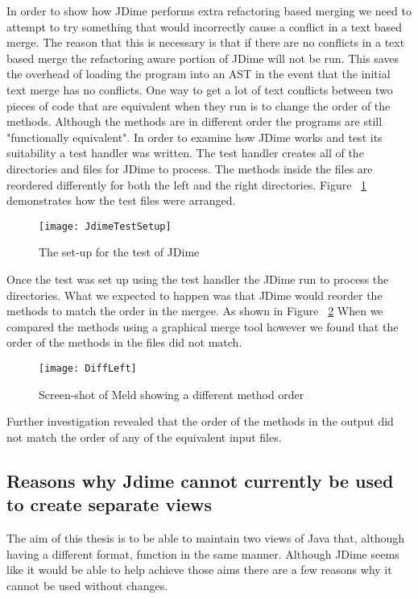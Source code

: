 In order to show how JDime performs extra refactoring based merging we need to attempt to try something that would incorrectly cause a conflict in a text based merge.  The reason that this is necessary is that if there are no conflicts in a text based merge the refactoring aware portion of JDime will not be run.  This saves the overhead of loading the program into an AST in the event that the initial text merge has no conflicts. 
One way to get a lot of text conflicts between two pieces of code that are equivalent when they run is to change the order of the methods.
Although the methods are in different order the programs are still "functionally equivalent".
In order to examine how JDime works and test its suitability a test handler was written.
The test handler creates all of the directories and files for JDime to process.
The methods inside the files are reordered differently for both the left and the right directories.
Figure ~\ref{fig:bgJDimeTest} demonstrates how the test files were arranged.


\begin{figure}[!t]
\begin{center}
\texttt{[image: JdimeTestSetup]}
\end{center}
 \label{fig:bgJDimeTest}
 \caption{The set-up for the test of JDime}
\end{figure}

Once the test was set up using the test handler the JDime run to process the directories.
What we expected to happen was that JDime would reorder the methods to match the order in the mergee. As shown in Figure ~\ref{fig:bgJDimeScreenShot} When we compared the methods using a graphical merge tool however we found that the order of the methods in the files did not match.

\begin{figure}[h]
\begin{center}
\texttt{[image: DiffLeft]}
\end{center}
 \label{fig:bgJDimeScreenShot}
 \caption{Screen-shot of Meld showing a different method order}
\end{figure}


Further investigation revealed that the order of the methods in the output did not match the order of any of the equivalent input files.    

\subsection{Reasons why Jdime cannot currently be used to create separate views}
The aim of this thesis is to be able to maintain two views of Java that, although having a different format, function in the same manner.  Although JDime seems like it would be able to help achieve those aims there are a few reasons why it cannot be used without changes.

